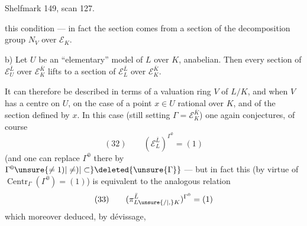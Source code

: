 Shelfmark 149, scan 127.

 this condition --- in fact the section comes from a section of the decomposition group $N_V$ over $\mathcal E_K$.

\noindent b) Let $U$ be an ``elementary'' model of $L$ over $K$, anabelian. Then every section of $\mathcal E_U^{\bar L}$ over $\mathcal E_K^{\bar K}$ lifts to a section of $\mathcal E_L^{\bar L}$ over $\mathcal E_K^{\bar K}$.

It can therefore be described in terms of a valuation ring $V$ of $L/K$, and when $V$ has a centre on $U$,   on the case of a point $x\in U$ rational over $K$, and of the section defined by $x$. In this case (still setting $\Gamma=\mathcal E_K^{\bar K}$) one again conjectures, of course
\[
(32)\qquad (\mathcal E_L^{\bar L})^{\Gamma^0}=(1)
\]
(and one can replace $\Gamma^0$ there by $\Gamma^0\unsure{\ne1)|\ne)|\subset}\deleted{\unsure{\Gamma}}$
--- but in fact this (by virtue of $\operatorname{Centr}_\Gamma(\Gamma^0)=(1)$) is equivalent to the analogous relation 
\[
(33)\qquad (\pi_{L\unsure{/|,}K}^{\bar L})^{\Gamma^0}=(1)
\]
which  moreover deduced, by dévissage,
